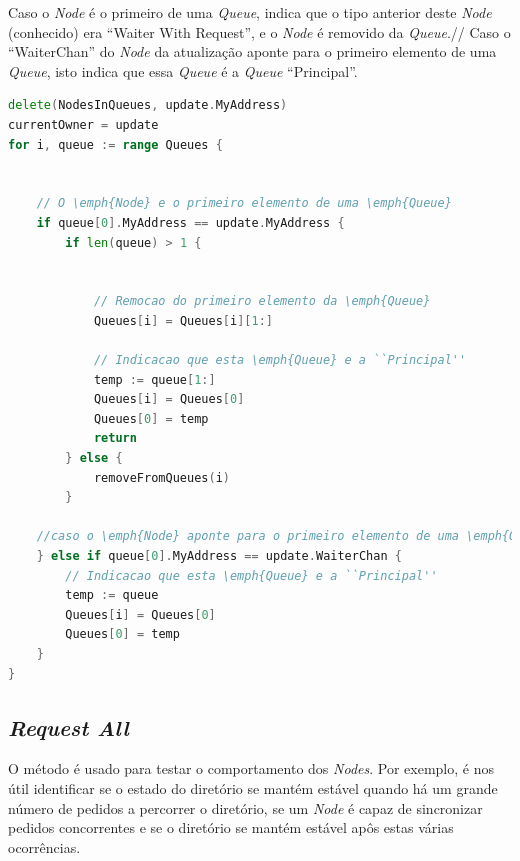 Caso o \emph{Node} é o primeiro de uma \emph{Queue}, indica que o tipo anterior deste \emph{Node} (conhecido) era ``Waiter With Request'', e o \emph{Node} é removido da \emph{Queue}.//
Caso o ``WaiterChan'' do \emph{Node} da atualização aponte para o primeiro elemento de uma \emph{Queue}, isto indica que essa \emph{Queue} é a \emph{Queue} ``Principal''.


\begin{lstlisting}[caption={ Alterações nas filas caso o \emph{Node} seja do tipo ``Owner With Request'' },language=Go]
delete(NodesInQueues, update.MyAddress)
currentOwner = update
for i, queue := range Queues {


	// O \emph{Node} e o primeiro elemento de uma \emph{Queue} 
	if queue[0].MyAddress == update.MyAddress {
		if len(queue) > 1 {


			// Remocao do primeiro elemento da \emph{Queue}
			Queues[i] = Queues[i][1:]

			// Indicacao que esta \emph{Queue} e a ``Principal''
			temp := queue[1:]
			Queues[i] = Queues[0]
			Queues[0] = temp
			return
		} else {
			removeFromQueues(i)
		}

	//caso o \emph{Node} aponte para o primeiro elemento de uma \emph{Queue}
	} else if queue[0].MyAddress == update.WaiterChan {
		// Indicacao que esta \emph{Queue} e a ``Principal''
		temp := queue
		Queues[i] = Queues[0]
		Queues[0] = temp
	}
}


\end{lstlisting}

\subsection*{\emph{Request All}}

O método é usado para testar o comportamento dos \emph{Nodes}.
Por exemplo, é nos útil identificar se o estado do diretório se mantém estável quando há um grande número de
pedidos a percorrer o diretório, se um \emph{Node} é capaz de sincronizar pedidos concorrentes e se o diretório se mantém estável apôs estas várias ocorrências.

